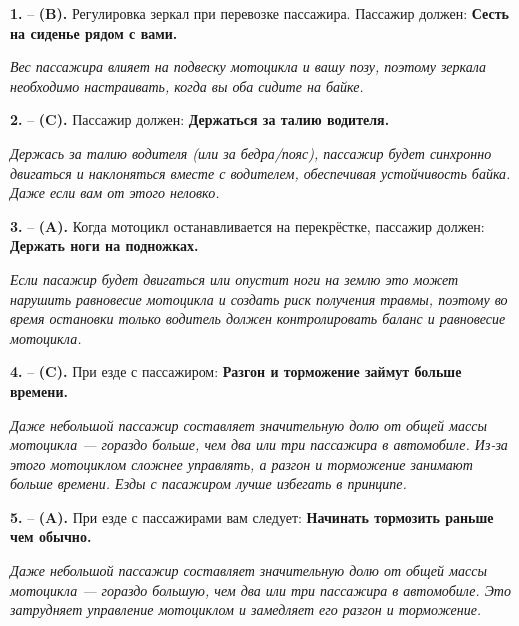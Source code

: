 \begin{minipage}{\linewidth}
\noindent\textbf{1.}  -- \textbf {(B).} Регулировка зеркал при перевозке пассажира. Пассажир должен:  \textbf {Сесть на сиденье рядом с вами.} \par \textit {Вес пассажира влияет на подвеску мотоцикла и вашу позу, поэтому зеркала необходимо настраивать, когда вы оба сидите на байке.} \\
\end{minipage}

\begin{minipage}{\linewidth}
\noindent\textbf{2.}  -- \textbf {(C).} Пассажир должен:  \textbf {Держаться за талию водителя.} \par \textit {Держась за талию водителя (или за бедра/пояс), пассажир будет синхронно двигаться и наклоняться вместе с водителем, обеспечивая устойчивость байка. Даже если вам от этого неловко.} \\
\end{minipage}

\begin{minipage}{\linewidth}
\noindent\textbf{3.}  -- \textbf {(A).} Когда мотоцикл останавливается на перекрёстке, пассажир должен:  \textbf {Держать ноги на подножках.} \par \textit {Если пасажир будет двигаться или опустит ноги на землю это может нарушить равновесие мотоцикла и создать риск получения травмы, поэтому во время остановки только водитель должен контролировать баланс и равновесие мотоцикла.} \\
\end{minipage}

\begin{minipage}{\linewidth}
\noindent\textbf{4.}  -- \textbf {(C).} При езде с пассажиром:  \textbf {Разгон и торможение займут больше времени.} \par \textit {Даже небольшой пассажир составляет значительную долю от общей массы мотоцикла — гораздо больше, чем два или три пассажира в автомобиле. Из-за этого мотоциклом сложнее управлять, а разгон и торможение занимают больше времени. Езды с пасажиром лучше избегать в принципе.} \\
\end{minipage}

\begin{minipage}{\linewidth}
\noindent\textbf{5.}  -- \textbf {(A).} При езде с пассажирами вам следует:  \textbf {Начинать тормозить раньше чем обычно.} \par \textit {Даже небольшой пассажир составляет значительную долю от общей массы мотоцикла — гораздо большую, чем два или три пассажира в автомобиле. Это затрудняет управление мотоциклом и замедляет его разгон и торможение.} \\
\end{minipage}

